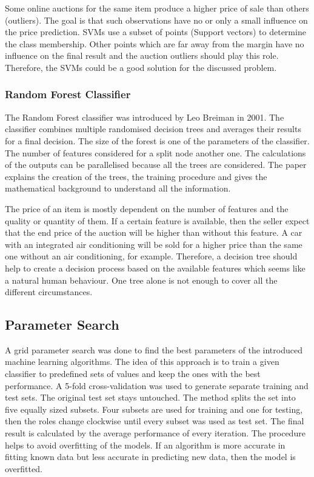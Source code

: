 Some online auctions for the same item produce a higher price of sale than others (outliers). The goal is that such observations have no or only a small influence on the price prediction. SVMs use a subset of points (Support vectors) to determine the class membership. Other points which are far away from the margin have no influence on the final result and the auction outliers should play this role. Therefore, the SVMs could be a good solution for the discussed problem. 
\subsubsection{Random Forest Classifier}
The Random Forest classifier was introduced by Leo Breiman in 2001\cite{breiman}. The classifier combines multiple randomised decision trees and averages their results for a final decision. The size of the forest is one of the parameters of the classifier. The number of features considered for a split node another one. The calculations of the outputs can be parallelised because all the trees are considered. The paper explains the creation of the trees, the training procedure and gives the mathematical background to understand all the information.

The price of an item is mostly dependent on the number of features and the quality or quantity of them. If a certain feature is available, then the seller expect that the end price of the auction will be higher than without this feature. A car with an integrated air conditioning will be sold for a higher price than the same one without an air conditioning, for example. Therefore, a decision tree should help to create a decision process based on the available features which seems like a natural human behaviour. One tree alone is not enough to cover all the different circumstances. 
\subsection{Parameter Search}
A grid parameter search was done to find the best parameters of the introduced machine learning algorithms. The idea of this approach is to train a given classifier to predefined sets of values and keep the ones with the best performance. A 5-fold cross-validation was used to generate separate training and test sets. The original test set stays untouched. The method splits the set into five equally sized subsets. Four subsets are used for training and one for testing, then the roles change clockwise until every subset was used as test set. The final result is calculated by the average performance of every iteration. The procedure helps to avoid overfitting of the models. If an algorithm is more accurate in fitting known data but less accurate in predicting new data, then the model is overfitted.
